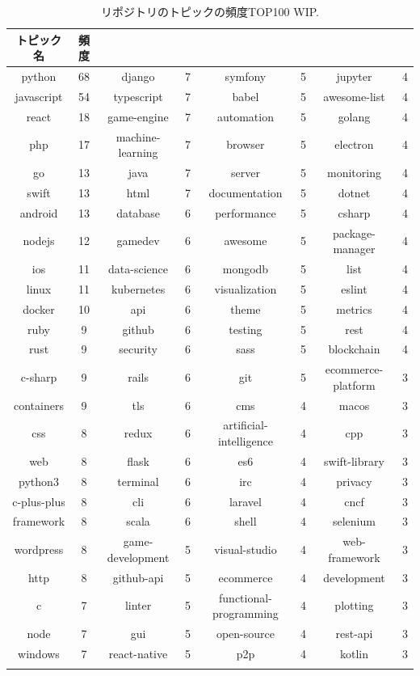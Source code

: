 \begin{table}[t]
\small
  \centering
  \caption{リポジトリのトピックの頻度TOP100 WIP.}
  \label{table:repo_topic_freq}
  \begin{tabular}{ c | c || c | c || c | c || c | c} \Xhline{3\arrayrulewidth}
トピック名 & 頻度 &  &  &  &  &  & \\ \hline \hline
python & 68 & django & 7 & symfony & 5 & jupyter & 4 \\
javascript & 54 & typescript & 7 & babel & 5 & awesome-list & 4 \\
react & 18 & game-engine & 7 & automation & 5 & golang & 4 \\
php & 17 & machine-learning & 7 & browser & 5 & electron & 4 \\
go & 13 & java & 7 & server & 5 & monitoring & 4 \\
swift & 13 & html & 7 & documentation & 5 & dotnet & 4 \\
android & 13 & database & 6 & performance & 5 & csharp & 4 \\
nodejs & 12 & gamedev & 6 & awesome & 5 & package-manager & 4 \\
ios & 11 & data-science & 6 & mongodb & 5 & list & 4 \\
linux & 11 & kubernetes & 6 & visualization & 5 & eslint & 4 \\
docker & 10 & api & 6 & theme & 5 & metrics & 4 \\
ruby & 9 & github & 6 & testing & 5 & rest & 4 \\
rust & 9 & security & 6 & sass & 5 & blockchain & 4 \\
c-sharp & 9 & rails & 6 & git & 5 & ecommerce-platform & 3 \\
containers & 9 & tls & 6 & cms & 4 & macos & 3 \\
css & 8 & redux & 6 & artificial-intelligence & 4 & cpp & 3 \\
web & 8 & flask & 6 & es6 & 4 & swift-library & 3 \\
python3 & 8 & terminal & 6 & irc & 4 & privacy & 3 \\
c-plus-plus & 8 & cli & 6 & laravel & 4 & cncf & 3 \\
framework & 8 & scala & 6 & shell & 4 & selenium & 3 \\
wordpress & 8 & game-development & 5 & visual-studio & 4 & web-framework & 3 \\
http & 8 & github-api & 5 & ecommerce & 4 & development & 3 \\
c & 7 & linter & 5 & functional-programming & 4 & plotting & 3 \\
node & 7 & gui & 5 & open-source & 4 & rest-api & 3 \\
windows & 7 & react-native & 5 & p2p & 4 & kotlin & 3 \\
\Xhline{3\arrayrulewidth}
\end{tabular}
\end{table}







